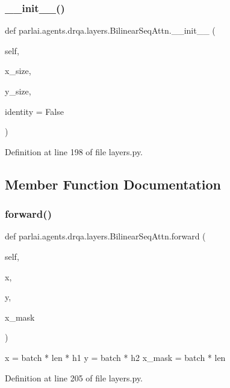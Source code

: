 \subsubsection{\texorpdfstring{\+\_\+\+\_\+init\+\_\+\+\_\+()}{\_\_init\_\_()}}
{\footnotesize\ttfamily def parlai.\+agents.\+drqa.\+layers.\+Bilinear\+Seq\+Attn.\+\_\+\+\_\+init\+\_\+\+\_\+ (\begin{DoxyParamCaption}\item[{}]{self,  }\item[{}]{x\+\_\+size,  }\item[{}]{y\+\_\+size,  }\item[{}]{identity = {\ttfamily False} }\end{DoxyParamCaption})}



Definition at line 198 of file layers.\+py.



\subsection{Member Function Documentation}
\mbox{\label{classparlai_1_1agents_1_1drqa_1_1layers_1_1BilinearSeqAttn_af6775803498ad914cd5e74cd228927e6}} 
\subsubsection{\texorpdfstring{forward()}{forward()}}
{\footnotesize\ttfamily def parlai.\+agents.\+drqa.\+layers.\+Bilinear\+Seq\+Attn.\+forward (\begin{DoxyParamCaption}\item[{}]{self,  }\item[{}]{x,  }\item[{}]{y,  }\item[{}]{x\+\_\+mask }\end{DoxyParamCaption})}

\begin{DoxyVerb}x = batch * len * h1
y = batch * h2
x_mask = batch * len
\end{DoxyVerb}
 

Definition at line 205 of file layers.\+py.



